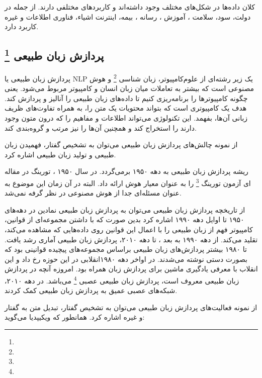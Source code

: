 \documentclass[a4paper, 12pt]{article}
\begin{document}
 کلان داده‌ها در شکل‌های مختلف وجود داشته‌اند و کاربرد‌های مختلفی دارند. از جمله در دولت، سود، سلامت ، آموزش ، رسانه ، بیمه، اینترنت اشیاء، فناوری اطلاعات و غیره کاربرد دارد. 
 
 \subsection*{پردازش زبان طبیعی
\footnote{} 
}
پردازش زبان طبیعی یا NLP یک زیر رشته‌ای از علوم‌کامپیوتر، زبان شناسی
\footnote{}
و هوش مصنوعی است که بیشتر به تعاملات میان زبان انسان و کامپیوتر مربوط می‌شود. یعنی چگونه کامپیوتر‌ها را برنامه‌ریزی کنیم تا داده‌های زبان طبیعی را آنالیز و پردازش کند. هدف یک کامپیوتری است که بتواند محتویات یک متن را، به همراه تفاوت‌های ظریف زبانی آن‌ها، بفهمد. این تکنولوژی می‌تواند اطلاعات و مفاهیم را که درون متون وجود دارند را استخراج کند و همچنین آن‌ها را نیز مرتب و گروه‌بندی کند. 

 از نمونه چالش‌های پردازش زبان طبیعی می‌توان به تشخیص گفتار، فهمیدن زبان طبیعی و تولید زبان طبیعی اشاره کرد. 
 
 ریشه پردازش زبان طبیعی به دهه ۱۹۵۰ برمی‌گردد. در سال ۱۹۵۰ ، تورینگ در مقاله ای آزمون تورینگ
 \footnote{}
 را به عنوان معیار هوش ارائه داد. البته در آن زمان این موضوع به عنوان مسئله‌ای جدا از هوش مصنوعی در نظر گرفه نمی‌شد. 
 
 از تاریخچه پردازش زبان طبیعی می‌توان به پردازش زبان طبیعی نمادین در دهه‌های ۱۹۵۰ تا اوایل دهه ۱۹۹۰ اشاره کرد بدین صورت که با داشتن مجموعه‌ای از قوانین، کامپیوتر فهم از زبان طبیعی را با اعمال این قوانین روی داده‌هایی که مشاهده می‌کند، تقلید می‌کند. از دهه ۱۹۹۰ به بعد ، تا دهه ۲۰۱۰، پردازش زبان طبیعی آماری رشد یافت. تا ۱۹۸۰ بیشتر پردازش‌های زبان طبیعی براساس مجموعه‌های پیچیده قوانینی بود که بصورت دستی نوشته می‌شدند. در اواخر دهه ۱۹۸۰انقلابی در این حوزه رخ داد و این انقلاب با معرفی یادگیری ماشین برای پردازش زبان همراه بود. 
 امروزه آنچه در پردازش زبان طبیعی معروف است، پردازش زبان طبیعی عصبی 
 \footnote{}
 می‌باشد. در دهه ۲۰۱۰، شبکه‌های عصبی عمیق به پردازش زبان طبیعی کمک کردند. 
 
 

	 	از نمونه فعالیت‌های پردازش زبان طبیعی می‌توان به تشخیص گفتار، تبدیل متن به گفتار و غیره اشاره کرد. همانطور که ویکیپدیا می‌گوید:
	 	
\end{document}
